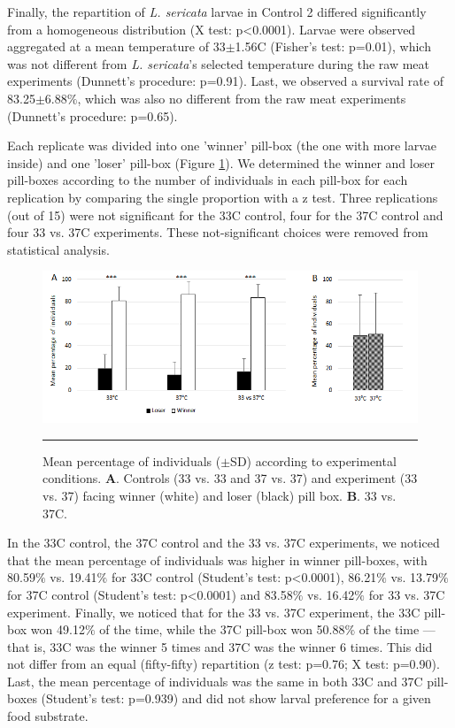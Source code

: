 Finally, the repartition of \textit{L. sericata} larvae in Control 2 differed significantly from a homogeneous distribution (X test: p<0.0001). Larvae were observed aggregated at a mean temperature of 33$\pm$1.56C (Fisher’s test: p=0.01), which was not different from \textit{L. sericata}’s selected temperature during the raw meat experiments (Dunnett’s procedure: p=0.91). Last, we observed a survival rate of 83.25$\pm$6.88$\%$, which was also no different from the raw meat experiments (Dunnett’s procedure: p=0.65). 

Each replicate was divided into one 'winner' pill-box (the one with more larvae inside) and one 'loser' pill-box (Figure \ref{fig:percent2cindy}). We determined the winner and loser pill-boxes according to the number of individuals in each pill-box for each replication by comparing the single proportion with a z test. Three replications (out of 15) were not significant for the 33C control, four for the 37C control and four 33 vs. 37C experiments. These not-significant choices were removed from statistical analysis.

\begin{figure}[ht]
\centering
		\includegraphics[width=1 \textwidth]{Figures/percent2cindy.png}
		\rule{35em}{0.5pt}
		\caption[Percent2Cindy]{Mean percentage of individuals ($\pm$SD) according to experimental conditions. \textbf{A}. Controls (33 vs. 33 and 37 vs. 37) and experiment (33 vs. 37) facing winner (white) and loser (black) pill box.  \textbf{B}. 33 vs. 37C.}
	\label{fig:percent2cindy}
\end{figure}  

In the 33C control, the 37C control and the 33 vs. 37C experiments, we noticed that the mean percentage of individuals was higher in winner pill-boxes, with 80.59$\%$ vs. 19.41$\%$ for 33C control (Student’s test: p<0.0001), 86.21$\%$ vs. 13.79$\%$ for 37C control (Student’s test: p<0.0001) and 83.58$\%$ vs. 16.42$\%$ for 33 vs. 37C experiment. Finally, we noticed that for the 33 vs. 37C experiment, the 33C pill-box won 49.12$\%$ of the time, while the 37C pill-box won 50.88$\%$ of the time — that is, 33C was the winner 5 times and 37C was the winner 6 times. This did not differ from an equal (fifty-fifty) repartition (z test: p=0.76; X test: p=0.90). Last, the mean percentage of individuals was the same in both 33C and 37C pill-boxes (Student’s test: p=0.939) and did not show larval preference for a given food substrate.
        
